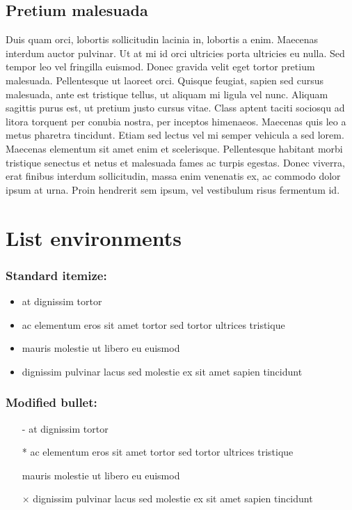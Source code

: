 \documentclass[a4paper,10pt]{article}
\begin{document}
\subsection{Pretium malesuada}
\label{s:pretium}

Duis quam orci, lobortis sollicitudin lacinia in, lobortis a enim. Maecenas interdum auctor pulvinar.
Ut at mi id orci ultricies porta ultricies eu nulla. Sed tempor leo vel fringilla euismod. Donec gravida velit
eget tortor pretium malesuada. Pellentesque ut laoreet orci. Quisque feugiat, sapien sed cursus malesuada,
ante est tristique tellus, ut aliquam mi ligula vel nunc. Aliquam sagittis purus est, ut pretium justo cursus vitae.
Class aptent taciti sociosqu ad litora torquent per conubia nostra, per inceptos himenaeos.
Maecenas quis leo a metus pharetra tincidunt. Etiam sed lectus vel mi semper vehicula a sed lorem.
Maecenas elementum sit amet enim et scelerisque.
Pellentesque habitant morbi tristique senectus et netus et malesuada fames ac turpis egestas.
Donec viverra, erat finibus interdum sollicitudin, massa enim venenatis ex, ac commodo dolor ipsum at urna.
Proin hendrerit sem ipsum, vel vestibulum risus fermentum id.

\pagebreak


\section*{List environments}

\subsubsection*{Standard itemize:}

\begin{itemize}
  \item at dignissim tortor
  \item ac elementum eros sit amet tortor sed tortor ultrices tristique
  \item mauris molestie ut libero eu euismod
  \item dignissim pulvinar lacus sed molestie ex sit amet sapien tincidunt
\end{itemize}

\subsubsection*{Modified bullet:}

\begin{itemize}
  \item[-] at dignissim tortor
  \item[*] ac elementum eros sit amet tortor sed tortor ultrices tristique
  \item[\checkmark] mauris molestie ut libero eu euismod
  \item[$\times$] dignissim pulvinar lacus sed molestie ex sit amet sapien tincidunt
\end{itemize}
\end{document}
